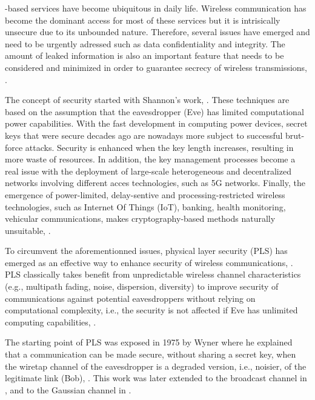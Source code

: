 \documentclass[12pt, draftclsnofoot, onecolumn]{IEEEtran}
\begin{document}
-based services have become ubiquitous in daily life. Wireless communication has become the dominant access for most of these services but it is intrisically unsecure due to its unbounded nature. Therefore, several issues have emerged and need to be urgently adressed such as data confidentiality and integrity. The amount of leaked information is also an important feature that needs to be considered and minimized in order to guarantee secrecy of wireless transmissions, \cite{8509094,8543573,BlochMatthieu1981-2011Ps:f}.

The concept of security started with Shannon's work, \cite{6769090}. These techniques are based on the assumption that the eavesdropper (Eve) has limited computational power capabilities. With the fast development in computing power devices, secret keys that were secure decades ago are nowadays more subject to successful brut-force attacks. Security is enhanced when the key length increases, resulting in more waste of resources. In addition, the key management processes become a real issue with the deployment of large-scale heterogeneous and decentralized networks involving different acces technologies, such as 5G networks. Finally, the emergence of power-limited, delay-sentive and processing-restricted wireless technologies, such as Internet Of Things (IoT), banking, health monitoring, vehicular communications, makes cryptography-based methods naturally unsuitable, \cite{8509094}.

To circumvent the aforementionned issues, physical layer security (PLS) has emerged as an effective way to enhance security of wireless communications, \cite{alves2012performance,yang2012physical,tran2015secrecy,8353879}. PLS classically takes benefit from unpredictable wireless channel characteristics (e.g., multipath fading, noise, dispersion, diversity) to improve security of communications against potential eavesdroppers without relying on computational complexity, i.e., the security is not affected if Eve has unlimited computing capabilities, \cite{9049811,snchez2020survey}. 

The starting point of PLS was exposed in 1975 by Wyner where he explained that a communication can be made secure, without sharing a secret key, when the wiretap channel of the eavesdropper is a degraded version, i.e., noisier, of the legitimate link (Bob), \cite{6772207}. This work was later extended to the broadcast channel in \cite{1055892}, and to the Gaussian channel in \cite{1055917}. 
\end{document}
